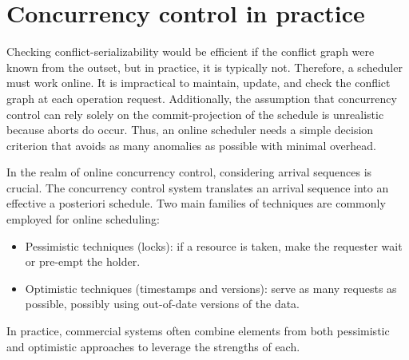 \section{Concurrency control in practice}

Checking conflict-serializability would be efficient if the conflict graph were known from the outset, but in practice, it is typically not.
Therefore, a scheduler must work online. 
It is impractical to maintain, update, and check the conflict graph at each operation request. 
Additionally, the assumption that concurrency control can rely solely on the commit-projection of the schedule is unrealistic because aborts do occur.
Thus, an online scheduler needs a simple decision criterion that avoids as many anomalies as possible with minimal overhead.
    
In the realm of online concurrency control, considering arrival sequences is crucial.
The concurrency control system translates an arrival sequence into an effective a posteriori schedule.
Two main families of techniques are commonly employed for online scheduling:
\begin{itemize}
    \item Pessimistic techniques (locks): if a resource is taken, make the requester wait or pre-empt the holder.
    \item Optimistic techniques (timestamps and versions): serve as many requests as possible, possibly using out-of-date versions of the data. 
\end{itemize}
In practice, commercial systems often combine elements from both pessimistic and optimistic approaches to leverage the strengths of each.